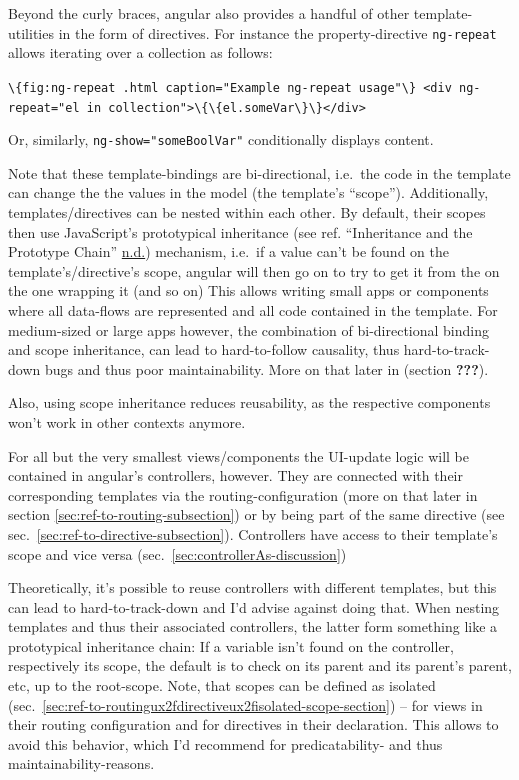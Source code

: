 \documentclass[a4paper,,tablecaptionabove]{scrbook}
\newcommand{\passthrough}[1]{#1}
\begin{document}
Beyond the curly braces, angular also provides a handful of other
template-utilities in the form of directives. For instance the
property-directive \passthrough{\lstinline!ng-repeat!} allows iterating
over a collection as follows:

\passthrough{\lstinline!\{fig:ng-repeat .html caption="Example ng-repeat usage"\} <div ng-repeat="el in collection">\{\{el.someVar\}\}</div>!}

Or, similarly, \passthrough{\lstinline!ng-show="someBoolVar"!}
conditionally displays content.

Note that these template-bindings are bi-directional, i.e.~the code in
the template can change the the values in the model (the template's
\enquote{scope}). Additionally, templates/directives can be nested
within each other. By default, their scopes then use JavaScript's
prototypical inheritance (see ref. ``Inheritance and the Prototype
Chain'' \protect\hyperlink{ref-Inheritanceprototypechain}{n.d.})
mechanism, i.e.~if a value can't be found on the template's/directive's
scope, angular will then go on to try to get it from the on the one
wrapping it (and so on) This allows writing small apps or components
where all data-flows are represented and all code contained in the
template. For medium-sized or large apps however, the combination of
bi-directional binding and scope inheritance, can lead to hard-to-follow
causality, thus hard-to-track-down bugs and thus poor maintainability.
More on that later in (section {\textbf{???}}).

Also, using scope inheritance reduces reusability, as the respective
components won't work in other contexts anymore.

For all but the very smallest views/components the UI-update logic will
be contained in angular's controllers, however. They are connected with
their corresponding templates via the routing-configuration (more on
that later in section \ref{sec:ref-to-routing-subsection}) or by being
part of the same directive (see
sec.~\ref{sec:ref-to-directive-subsection}). Controllers have access to
their template's scope and vice versa
(sec.~\ref{sec:controllerAs-discussion})

Theoretically, it's possible to reuse controllers with different
templates, but this can lead to hard-to-track-down and I'd advise
against doing that. When nesting templates and thus their associated
controllers, the latter form something like a prototypical inheritance
chain: If a variable isn't found on the controller, respectively its
scope, the default is to check on its parent and its parent's parent,
etc, up to the root-scope. Note, that scopes can be defined as isolated
(sec.~\ref{sec:ref-to-routingux2fdirectiveux2fisolated-scope-section})
-- for views in their routing configuration and for directives in their
declaration. This allows to avoid this behavior, which I'd recommend for
predicatability- and thus maintainability-reasons.
\end{document}
